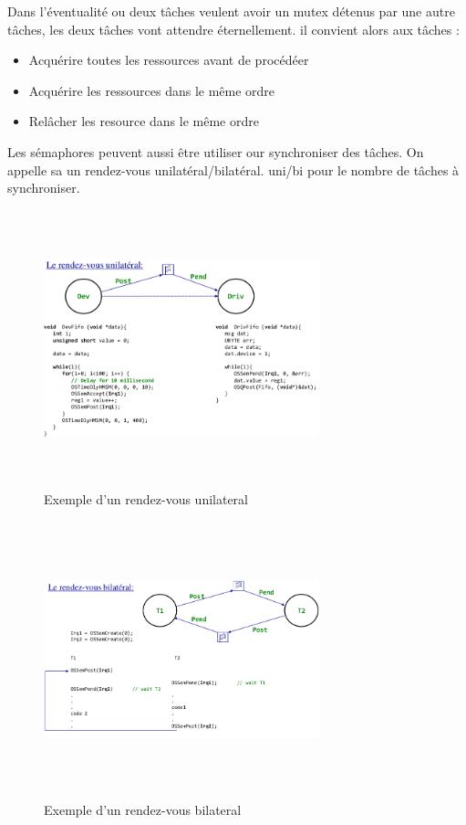\documentclass[oneside]{book}
\begin{document}
    Dans l'éventualité ou deux tâches veulent avoir un mutex détenus par une autre tâches, les deux tâches vont attendre éternellement. il convient alors aux tâches :
    
    \begin{itemize}
        \item Acquérire toutes les ressources avant de procédéer
        \item Acquérire les ressources dans le même ordre
        \item Relâcher les resource dans le même ordre
    \end{itemize}

    
    
    Les sémaphores peuvent aussi être utiliser our synchroniser des tâches. On appelle sa un rendez-vous unilatéral/bilatéral. uni/bi pour le nombre de tâches à synchroniser.\\
    
    \begin{figure}[!ht]
    	\centering
    	\includegraphics[width=8cm, height = 8cm, keepaspectratio]{Images/rdv_unilateral.png}
    	\caption{Exemple d'un rendez-vous unilateral}
    	\label{fig:Unilateral}
    \end{figure}
    
    \begin{figure}[!ht]
    	\centering
    	\includegraphics[width=8cm, height = 8cm, keepaspectratio]{Images/rdv_bilateral.png}
    	\caption{Exemple d'un rendez-vous bilateral}
    	\label{fig:Bilateral}
    \end{figure}
    
\end{document}
